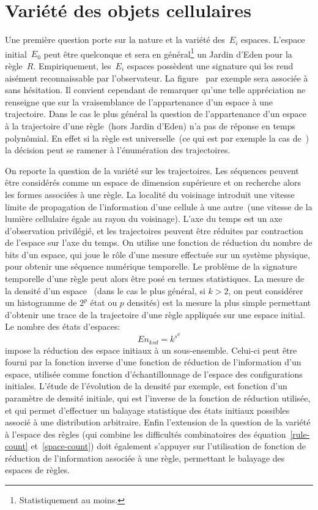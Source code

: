 \section{Variété des objets cellulaires}

Une première question porte sur la nature et la variété des~$E_i$
espaces. %
L'espace initial~$E_0$ peut être quelconque et sera en
général\footnote{%
  Statistiquement au moins.} %
un Jardin d'Eden pour la règle~$R$. %
Empiriquement, les~$E_i$ espaces possèdent une signature qui
les rend aisément reconnaissable par l'observateur. %
La figure~ par exemple sera associée à~
sans hésitation. %
Il convient cependant de remarquer qu'une telle appréciation ne
renseigne que sur la vraisemblance de l'appartenance d'un espace à une
trajectoire. %
Dans le cas le plus général la question de l'appartenance d'un espace
à la trajectoire d'une règle~(hors Jardin d'Eden) n'a pas de réponse
en temps polynômial. %
En effet si la règle est universelle~(ce qui est par exemple la cas
de~) la décision peut se ramener à l'énumération des
trajectoires. %

On reporte la question de la variété sur les trajectoires. %
Les séquences peuvent être considérés comme un espace de dimension
supérieure et on recherche alors les formes
associées à une règle. %
La localité du voisinage introduit une vitesse limite de propagation
de l'information d'une cellule à une autre~(une vitesse de la lumière
cellulaire égale au rayon du voisinage). %
L'axe du temps est un axe d'observation privilégié, et les trajectoires
peuvent être réduites par contraction de l'espace sur l'axe du temps. %
On utilise une fonction de réduction du nombre de bits d'un espace,
qui joue le rôle d'une mesure effectuée sur un système physique, %
pour obtenir une séquence numérique temporelle. %
Le problème de la signature temporelle d'une règle peut alors être
posé en termes statistiques. %
La mesure de la densité d'un espace~%
(dans le cas le plus général, si $k > 2$, on peut considérer un
histogramme de $2^p$ état ou $p$ densités) %
est la mesure la plus simple permettant d'obtenir une trace de la
trajectoire d'une règle appliquée sur une espace initial. %
Le nombre des états d'espaces:
\begin{equation}
  En_{ksd} = k^{s^d}
  \label{space-count}
\end{equation}
impose la réduction des espace initiaux à un sous-ensemble. %
Celui-ci peut être fourni par la fonction inverse d'une fonction de
réduction de l'information d'un espace, utilisée comme fonction
d'échantillonnage de l'espace des configurations initiales. %
L'étude de l'évolution de la densité par exemple, est fonction d'un
paramètre de densité initiale, qui est l'inverse de la fonction de
réduction utilisée, et qui permet d'effectuer un balayage statistique
des états initiaux possibles associé à une distribution arbitraire. %
Enfin l'extension de la question de la variété à l'espace des règles
(qui combine les difficultés combinatoires des équation~\ref{rule-count}
et~\ref{space-count}) doit également s'appuyer sur l'utilisation de
fonction de réduction de l'information associée à une règle, permettant
le balayage des espaces de règles. %

